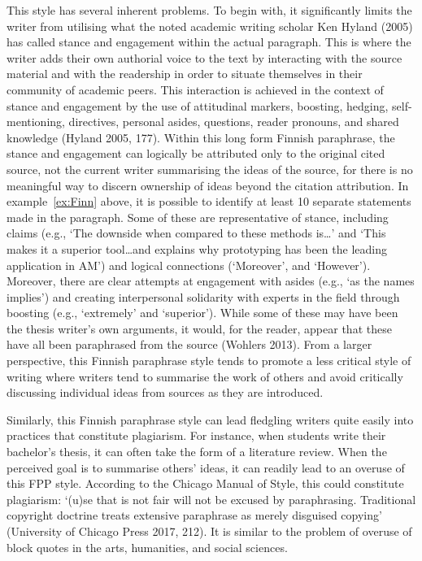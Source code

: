 \documentclass[english, 12pt, a4paper, biz, utf8, a-2b, online]{aaltothesis}
\begin{document}
\vspace{1em}
This style has several inherent problems. To begin with, it significantly limits
the writer from utilising what the noted academic writing scholar Ken Hyland 
(2005) has called stance and engagement within the actual paragraph. This is 
where the writer adds their own authorial voice to the text by interacting with 
the source material and with the readership in order to situate themselves in 
their community of academic peers. This interaction is achieved in the context 
of stance and engagement by the use of attitudinal markers, boosting, hedging, 
self-mentioning, directives, personal asides, questions, reader pronouns, and 
shared knowledge (Hyland 2005, 177). Within this long form Finnish paraphrase, 
the stance and engagement can logically be attributed only to the original cited
source, not the current writer summarising the ideas of the source, for there is
no meaningful way to discern ownership of ideas beyond the citation attribution.
In example~\ref{ex:Finn} above, it is possible to identify at least 10 separate 
statements made in the paragraph. Some of these are representative of stance, 
including claims (e.g., ‘The downside when compared to these methods is\ldots’ 
and ‘This makes it a superior tool\ldots and explains why prototyping has been 
the leading application in AM’) and logical connections (‘Moreover’, and 
‘However’). Moreover, there are clear attempts at engagement with asides (e.g., 
‘as the names implies’) and creating interpersonal solidarity with experts in 
the field through boosting (e.g., ‘extremely’ and ‘superior’). While some of 
these may have been the thesis writer’s own arguments, it would, for the reader,
appear that these have all been paraphrased from the source (Wohlers 2013). From
a larger perspective, this Finnish paraphrase style tends to promote a less 
critical style of writing where writers tend to summarise the work of others and
avoid critically discussing individual ideas from sources as they are 
introduced.

Similarly, this Finnish paraphrase style can lead fledgling writers quite easily
into practices that constitute plagiarism. For instance, when students write 
their bachelor’s thesis, it can often take the form of a literature review. When 
the perceived goal is to summarise others’ ideas, it can readily lead to an 
overuse of this FPP style. According to the Chicago Manual of Style, this could 
constitute plagiarism: ‘(u)se that is not fair will not be excused by 
paraphrasing. Traditional copyright doctrine treats extensive paraphrase as 
merely disguised copying’ (University of Chicago Press 2017, 212). It is similar
to the problem of overuse of block quotes in the arts, humanities, and social 
sciences.
\end{document}
